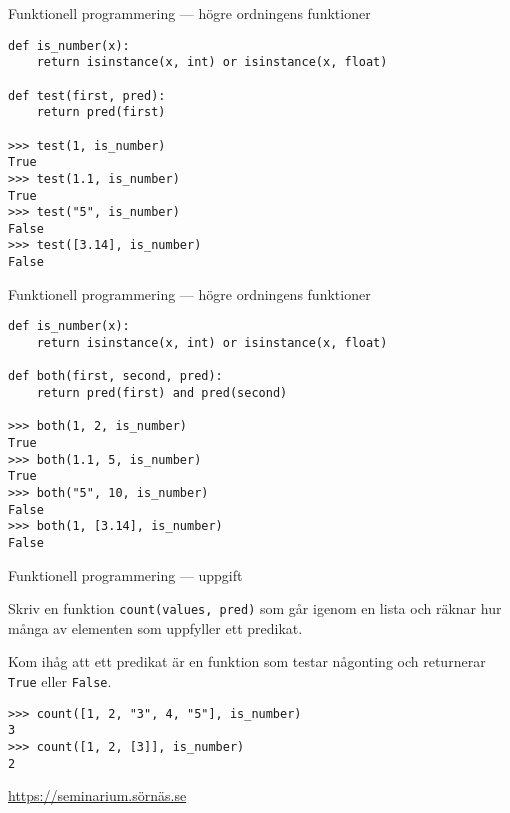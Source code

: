 \documentclass{beamer}
\begin{document}
  \begin{frame}[fragile]{Funktionell programmering --- högre ordningens funktioner}

    \begin{lstlisting}
def is_number(x):
    return isinstance(x, int) or isinstance(x, float)

def test(first, pred):
    return pred(first)

>>> test(1, is_number)
True
>>> test(1.1, is_number)
True
>>> test("5", is_number)
False
>>> test([3.14], is_number)
False
    \end{lstlisting}

  \end{frame}

  \begin{frame}[fragile]{Funktionell programmering --- högre ordningens funktioner}

    \begin{lstlisting}
def is_number(x):
    return isinstance(x, int) or isinstance(x, float)

def both(first, second, pred):
    return pred(first) and pred(second)

>>> both(1, 2, is_number)
True
>>> both(1.1, 5, is_number)
True
>>> both("5", 10, is_number)
False
>>> both(1, [3.14], is_number)
False
    \end{lstlisting}

  \end{frame}

  \begin{frame}[fragile]{Funktionell programmering --- uppgift}

    Skriv en funktion \texttt{count(values, pred)} som går igenom en lista och
    räknar hur många av elementen som uppfyller ett predikat.

    \pause{}

    Kom ihåg att ett predikat är en funktion som testar någonting och
    returnerar \texttt{True} eller \texttt{False}.

    \pause{}

    \begin{lstlisting}
>>> count([1, 2, "3", 4, "5"], is_number)
3
>>> count([1, 2, [3]], is_number)
2
    \end{lstlisting}

    \pause{}

    \url{https://seminarium.sörnäs.se}

  \end{frame}
\end{document}
